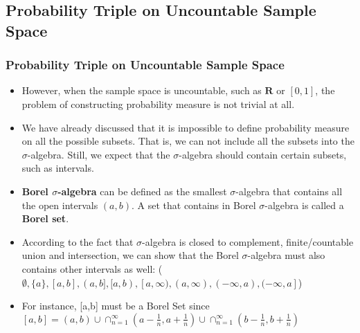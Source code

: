 \documentclass[handout]{beamer}
\begin{document}
\subsection{Probability Triple on Uncountable Sample Space}
\frame
{
  \frametitle{Probability Triple on Uncountable Sample Space}

   \begin{itemize}

      
       \item<1->  However, when the sample space is uncountable, such as $\mathbf{R}$ or $[0,1]$, the problem of constructing probability measure is not trivial at all. 
       
            \item<2-> We have already discussed that it is impossible to define probability measure on all the possible subsets. That is, we can not include all the subsets into the $\sigma$-algebra. Still, we expect that the $\sigma$-algebra should contain certain subsets, such as intervals. 
            
               \item<3-> \textbf{Borel $\sigma$-algebra} can be defined as the smallest $\sigma$-algebra that contains all the open intervals $(a,b)$. A set that contains in Borel $\sigma$-algebra is called a \textbf{Borel set}. 
               
                \item<4-> According to the fact that $\sigma$-algebra is closed to complement, finite/countable union and intersection, we can show that the Borel 
                              $\sigma$-algebra must also contains other intervals as well: ($\emptyset, \{a\}, [a,b], (a,b], [a,b), [a,\infty), (a,\infty),  (-\infty,a), (-\infty,a] $)
               
                             \item<4-> For instance, [a,b] must be a Borel Set since $[a,b]=(a,b) \cup \cap_{n=1}^\infty (a-\frac{1}{n}, a+\frac{1}{n} ) \cup \cap_{n=1}^\infty (b-\frac{1}{n}, b+\frac{1}{n} )$                                               \end{itemize}
}
\end{document}

